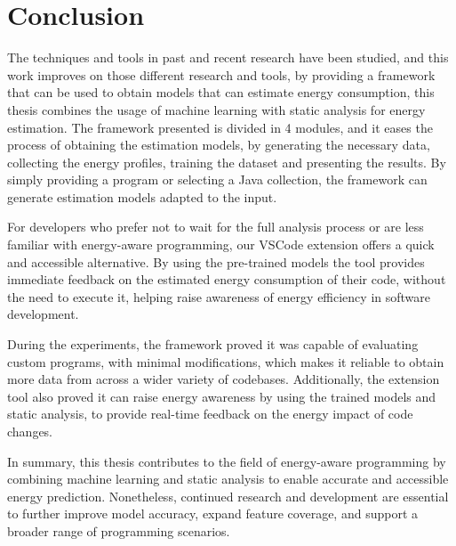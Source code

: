 
\chapter{Conclusion}\label{chapter:conclusion}


The techniques and tools in past and recent research have been studied, and this work improves on those different research and tools, by providing a framework that can be used to obtain models that can estimate energy consumption, this thesis combines the usage of machine learning with static analysis for energy estimation.
The framework presented is divided in 4 modules, and it eases the process of obtaining the estimation models, by generating the necessary data, collecting the energy profiles, training the dataset and presenting the results. By simply providing a program or selecting a Java collection, the framework can generate estimation models adapted to the input. 

For developers who prefer not to wait for the full analysis process or are less familiar with energy-aware programming, our VSCode extension offers a quick and accessible alternative. By using the pre-trained models the tool provides immediate feedback on the estimated energy consumption of their code, without the need to execute it, helping raise awareness of energy efficiency in software development. 

During the experiments, the framework proved it was capable of evaluating custom programs, with minimal modifications, which makes it reliable to obtain more data from across a wider variety of codebases. Additionally, the extension tool also proved it can raise energy awareness by using the trained models and static analysis, to provide real-time feedback on the energy impact of code changes.

In summary, this thesis contributes to the field of energy-aware programming by combining machine learning and static analysis to enable accurate and accessible energy prediction. Nonetheless, continued research and development are essential to further improve model accuracy, expand feature coverage, and support a broader range of programming scenarios.
